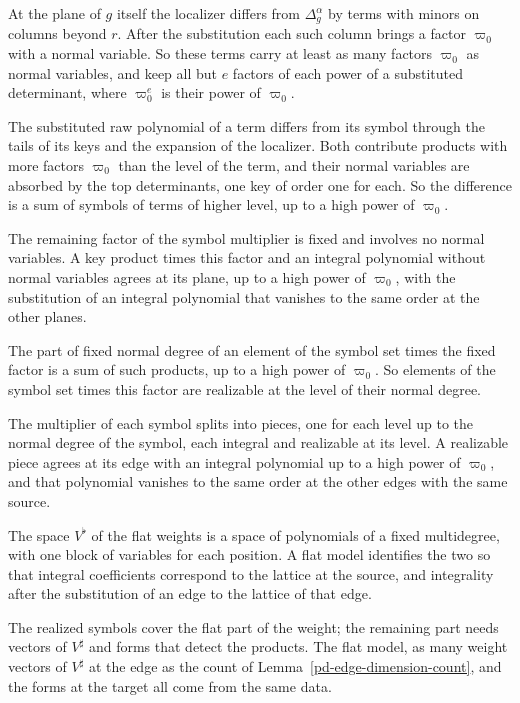 At the plane of $g$ itself the localizer differs from $\Delta^\alpha_g$ by terms with minors on
columns beyond $r$. After the substitution each such column brings a factor $\varpi_0$ with a normal
variable. So these terms carry at least as many factors $\varpi_0$ as normal variables, and keep all but
$e$ factors of each power of a substituted determinant, where $\varpi_0^e$ is their power of
$\varpi_0$.

The substituted raw polynomial of a term differs from its symbol through the tails of its keys and the
expansion of the localizer. Both contribute products with more factors $\varpi_0$ than the level of the
term, and their normal variables are absorbed by the top determinants, one key of order one for each.
So the difference is a sum of symbols of terms of higher level, up to a high power of $\varpi_0$.

The remaining factor of the symbol multiplier is fixed and involves no normal variables. A key product
times this factor and an integral polynomial without normal variables agrees at its plane, up to a high
power of $\varpi_0$, with the substitution of an integral polynomial that vanishes to the same order at
the other planes.

The part of fixed normal degree of an element of the symbol set times the fixed factor is a sum of such
products, up to a high power of $\varpi_0$. So elements of the symbol set times this factor are
realizable at the level of their normal degree.

The multiplier of each symbol splits into pieces, one for each level up to the normal degree of the
symbol, each integral and realizable at its level. A realizable piece agrees at its edge with an
integral polynomial up to a high power of $\varpi_0$, and that polynomial vanishes to the same order
at the other edges with the same source.

The space $V^\flat$ of the flat weights is a space of polynomials of a fixed multidegree, with one
block of variables for each position. A flat model identifies the two so that integral coefficients
correspond to the lattice at the source, and integrality after the substitution of an edge to the
lattice of that edge.

The realized symbols cover the flat part of the weight; the remaining part needs vectors of
$V^\sharp$ and forms that detect the products. The flat model, as many weight vectors of $V^\sharp$
at the edge as the count of Lemma~\ref{pd-edge-dimension-count}, and the forms at the target all come
from the same data.

